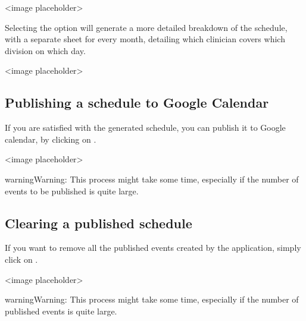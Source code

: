 \documentclass[letterpaper,10pt,english]{sphinxmanual}
\begin{document}
\textless{}image placeholder\textgreater{}

Selecting the  option will generate a more detailed breakdown
of the schedule, with a separate sheet for every month, detailing which
clinician covers which division on which day.

\textless{}image placeholder\textgreater{}


\subsection{Publishing a schedule to Google Calendar}
\label{\detokenize{index:publishing-a-schedule-to-google-calendar}}\label{\detokenize{index:id6}}
If you are satisfied with the generated schedule, you can publish it
to Google calendar, by clicking on .

\textless{}image placeholder\textgreater{}

\begin{sphinxadmonition}{warning}{Warning:}
This process might take some time, especially if the number of events
to be published is quite large.
\end{sphinxadmonition}


\subsection{Clearing a published schedule}
\label{\detokenize{index:clearing-a-published-schedule}}
If you want to remove all the published events created by the application,
simply click on .

\textless{}image placeholder\textgreater{}

\begin{sphinxadmonition}{warning}{Warning:}
This process might take some time, especially if the number of published
events is quite large.
\end{sphinxadmonition}



\renewcommand{\indexname}{Index}
\printindex
\end{document}
